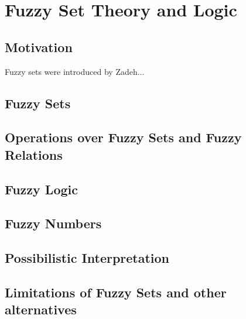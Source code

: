 \chapter{Fuzzy Set Theory and Logic}
\section*{Motivation}
Fuzzy sets were introduced by Zadeh...

\section{Fuzzy Sets}

\section{Operations over Fuzzy Sets and Fuzzy Relations}

\section{Fuzzy Logic}\label{sec:fuzzy_logic}

\section{Fuzzy Numbers}\label{sec:fuzzy_numbers}

\section{Possibilistic Interpretation}

\section{Limitations of Fuzzy Sets and other alternatives}